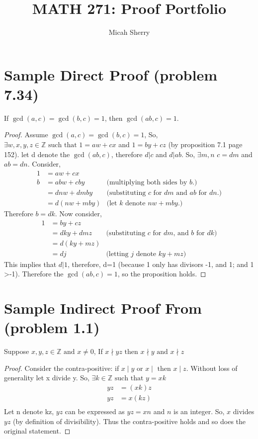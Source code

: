 \documentclass{article}
\title{MATH 271: Proof Portfolio}
\author{Micah Sherry}
\newcommand{\Z}{\mathbb{Z}}
\newcommand{\st}{\text{ such that }}
\begin{document}
	\maketitle
	\section*{Sample Direct Proof (problem 7.34)}
	If $\gcd(a,c)= \gcd(b,c)=1$, then $\gcd(ab,c)=1$.
	\begin{proof}
		Assume $\gcd(a,c)= \gcd(b,c)=1$, So, $\exists w, x, y, z  \in \Z \st 1= aw+ cx$ and $1= by + cz$ (by proposition 7.1 page 152).
		let d denote the $\gcd(ab,c)$, therefore $d|c$ and $d| ab$. So, $\exists m,n$ \st $c=dm$ and $ab =dn$. 
		Consider, 
		\begin{align*}
			1 &= aw+cx\\
			b &= abw+cby 	& \text{(multiplying both sides by $b$.)}\\
			&= dnw+dmby 	& \text{(substituting $c$ for $dm$ and $ab$ for $dn$.)}\\
			&= d(nw+mby) 	& \text{(let $k$ denote $nw+mby$.)}
		\end{align*}
		Therefore $b = dk$. Now consider,
		\begin{align*}
			1 &= by + cz \\
			&= dky+ dmz & \text{(substituting $c$ for $dm$, and $b$ for $dk$)}\\
			&= d(ky+mz) \\				  
			&= dj 	  & \text{(letting $j$ denote $ky+mz$)}
		\end{align*}
		This implies that $d|1$, therefore, d=1 (because 1 only has divisors -1, and 1; and 1 >-1). Therefore the $\gcd(ab,c)=1$, so the proposition holds.
	\end{proof}
	
	\section*{Sample Indirect Proof From (problem 1.1)}
	Suppose $x, y, z \in \Z \text{ and } x \neq 0$, If $x \nmid yz \text{ then } x \nmid y \text{ and } x \nmid z $ 
	\begin{proof}
		Consider the contra-positive: if $x \mid y \text{ or } x \mid \text{ then } x \mid z $. Without loss of generality let x divide y. 
		So, $ \exists k \in \Z \st y = xk $ 
		\begin{align*}
		yz &= (xk)z\\
		yz &= x(kz)\\
		\end{align*}
		Let n denote kz, $yz$ can be expressed as $yz = xn$ and $n$ is an integer. So, $x$ divides $yz$ (by definition of divisibility). Thus the contra-positive holds and so does the original statement.
		
	\end{proof}
	
\end{document}
